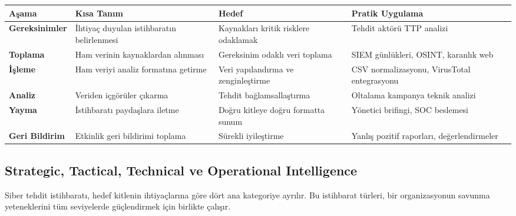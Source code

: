 \begin{longtable}{|p{2.5cm}|p{3cm}|p{3cm}|p{3.5cm}|}
\hline
\textbf{Aşama} & \textbf{Kısa Tanım} & \textbf{Hedef} & \textbf{Pratik Uygulama} \\ \hline
\textbf{Gereksinimler} & İhtiyaç duyulan istihbaratın belirlenmesi & Kaynakları kritik risklere odaklamak & Tehdit aktörü TTP analizi \\ \hline
\textbf{Toplama} & Ham verinin kaynaklardan alınması & Gereksinim odaklı veri toplama & SIEM günlükleri, OSINT, karanlık web \\ \hline
\textbf{İşleme} & Ham veriyi analiz formatına getirme & Veri yapılandırma ve zenginleştirme & CSV normalizasyonu, VirusTotal entegrasyonu \\ \hline
\textbf{Analiz} & Veriden içgörüler çıkarma & Tehdit bağlamsallaştırma & Oltalama kampanya teknik analizi \\ \hline
\textbf{Yayma} & İstihbaratı paydaşlara iletme & Doğru kitleye doğru formatta sunum & Yönetici brifingi, SOC beslemesi \\ \hline
\textbf{Geri Bildirim} & Etkinlik geri bildirimi toplama & Sürekli iyileştirme & Yanlış pozitif raporları, değerlendirmeler \\ \hline
\end{longtable}

\subsection{Strategic, Tactical, Technical ve Operational Intelligence}

Siber tehdit istihbaratı, hedef kitlenin ihtiyaçlarına göre dört ana kategoriye ayrılır. Bu istihbarat türleri, bir organizasyonun savunma yeteneklerini tüm seviyelerde güçlendirmek için birlikte çalışır.

